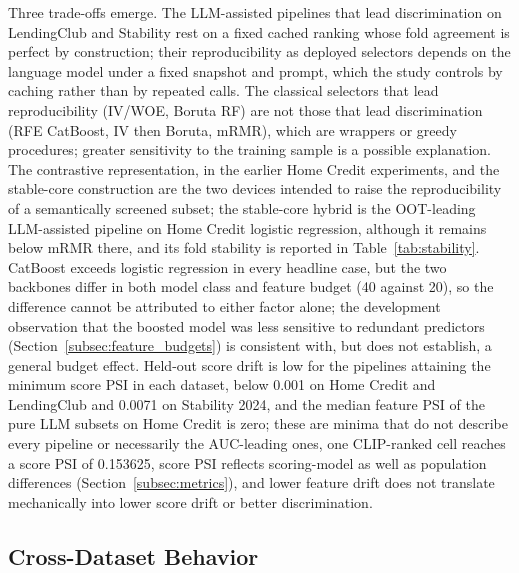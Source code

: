 \documentclass[final,5p,twocolumn]{elsarticle}
\begin{document}
Three trade-offs emerge. The LLM-assisted pipelines that lead discrimination on LendingClub and Stability rest on a fixed cached ranking whose fold agreement is perfect by construction; their reproducibility as deployed selectors depends on the language model under a fixed snapshot and prompt, which the study controls by caching rather than by repeated calls. The classical selectors that lead reproducibility (IV/WOE, Boruta RF) are not those that lead discrimination (RFE CatBoost, IV then Boruta, mRMR), which are wrappers or greedy procedures; greater sensitivity to the training sample is a possible explanation. The contrastive representation, in the earlier Home Credit experiments, and the stable-core construction are the two devices intended to raise the reproducibility of a semantically screened subset; the stable-core hybrid is the OOT-leading LLM-assisted pipeline on Home Credit logistic regression, although it remains below mRMR there, and its fold stability is reported in Table~\ref{tab:stability}. CatBoost exceeds logistic regression in every headline case, but the two backbones differ in both model class and feature budget (40 against 20), so the difference cannot be attributed to either factor alone; the development observation that the boosted model was less sensitive to redundant predictors (Section~\ref{subsec:feature_budgets}) is consistent with, but does not establish, a general budget effect. Held-out score drift is low for the pipelines attaining the minimum score PSI in each dataset, below 0.001 on Home Credit and LendingClub and 0.0071 on Stability 2024, and the median feature PSI of the pure LLM subsets on Home Credit is zero; these are minima that do not describe every pipeline or necessarily the AUC-leading ones, one CLIP-ranked cell reaches a score PSI of 0.153625, score PSI reflects scoring-model as well as population differences (Section~\ref{subsec:metrics}), and lower feature drift does not translate mechanically into lower score drift or better discrimination.

\subsection{Cross-Dataset Behavior}
\label{subsec:cross_dataset}
\end{document}
